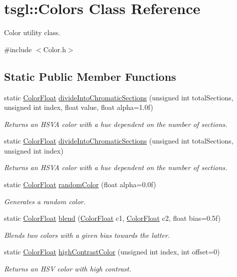 \hypertarget{classtsgl_1_1_colors}{}\section{tsgl\+:\+:Colors Class Reference}
\label{classtsgl_1_1_colors}


Color utility class.  




{\ttfamily \#include $<$Color.\+h$>$}

\subsection*{Static Public Member Functions}
\begin{DoxyCompactItemize}
\item 
static \hyperlink{structtsgl_1_1_color_float}{Color\+Float} \hyperlink{classtsgl_1_1_colors_af610e20b5176294e24fdae4af4f5d6dc}{divide\+Into\+Chromatic\+Sections} (unsigned int total\+Sections, unsigned int index, float value, float alpha=1.\+0f)
\begin{DoxyCompactList}\small\item\em Returns an H\+S\+V\+A color with a hue dependent on the number of sections. \end{DoxyCompactList}\item 
static \hyperlink{structtsgl_1_1_color_float}{Color\+Float} \hyperlink{classtsgl_1_1_colors_ab9c66054f181ca5db5839ede985fb112}{divide\+Into\+Chromatic\+Sections} (unsigned int total\+Sections, unsigned int index)
\begin{DoxyCompactList}\small\item\em Returns an H\+S\+V\+A color with a hue dependent on the number of sections. \end{DoxyCompactList}\item 
static \hyperlink{structtsgl_1_1_color_float}{Color\+Float} \hyperlink{classtsgl_1_1_colors_a0f28a13af4a0fc352a250c23ecc97e4f}{random\+Color} (float alpha=0.\+0f)
\begin{DoxyCompactList}\small\item\em Generates a random color. \end{DoxyCompactList}\item 
static \hyperlink{structtsgl_1_1_color_float}{Color\+Float} \hyperlink{classtsgl_1_1_colors_a26a34b86c0b70fe4984a91a24a0f263f}{blend} (\hyperlink{structtsgl_1_1_color_float}{Color\+Float} c1, \hyperlink{structtsgl_1_1_color_float}{Color\+Float} c2, float bias=0.\+5f)
\begin{DoxyCompactList}\small\item\em Blends two colors with a given bias towards the latter. \end{DoxyCompactList}\item 
static \hyperlink{structtsgl_1_1_color_float}{Color\+Float} \hyperlink{classtsgl_1_1_colors_a93d3fc815542e586dbc1ecf3e984e0b6}{high\+Contrast\+Color} (unsigned int index, int offset=0)
\begin{DoxyCompactList}\small\item\em Returns an H\+S\+V color with high contrast. \end{DoxyCompactList}\end{DoxyCompactItemize}
